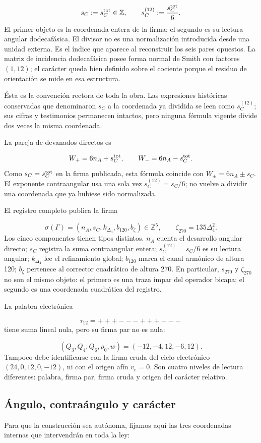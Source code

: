 \[
s_C:=s_C^{\rm tot}\in\mathbb Z,
\qquad
s_C^{(12)}:=\frac{s_C^{\rm tot}}6.
\]
El primer objeto es la coordenada entera de la firma; el segundo es su lectura angular dodecafásica. El divisor no es una normalización introducida desde una unidad externa. Es el índice que aparece al reconstruir los seis pares opuestos. La matriz de incidencia dodecafásica posee forma normal de Smith con factores \((1,12)\); el carácter queda bien definido sobre el cociente porque el residuo de orientación se mide en esa estructura.

Ésta es la convención rectora de toda la obra. Las expresiones históricas conservadas que denominaron \(s_C\) a la coordenada ya dividida se leen como \(s_C^{(12)}\); sus cifras y testimonios permanecen intactos, pero ninguna fórmula vigente divide dos veces la misma coordenada.

La pareja de devanados directos es

\[
W_+=6n_A+s_C^{\rm tot},
\qquad
W_-=6n_A-s_C^{\rm tot}.
\]
Como \(s_C=s_C^{\rm tot}\) en la firma publicada, esta fórmula coincide con \(W_\pm=6n_A\pm s_C\). El exponente contraangular usa una sola vez \(s_C^{(12)}=s_C/6\); no vuelve a dividir una coordenada que ya hubiese sido normalizada.

El registro completo publica la firma

\[
\sigma(\Gamma)=
(n_A,s_C,k_{\Delta_4},b_{120},b_\zeta)\in\mathbb Z^5,
\qquad
\zeta_{270}=135\Delta_4^2.
\]
Los cinco componentes tienen tipos distintos. \(n_A\) cuenta el desarrollo angular directo; \(s_C\) registra la suma contraangular entera; \(s_C^{(12)}=s_C/6\) es su lectura angular; \(k_{\Delta_4}\) lee el refinamiento global; \(b_{120}\) marca el canal armónico de altura 120; \(b_\zeta\) pertenece al corrector cuadrático de altura 270. En particular, \(s_{270}\) y \(\zeta_{270}\) no son el mismo objeto: el primero es una traza impar del operador bicapa; el segundo es una coordenada cuadrática del registro.

La palabra electrónica

\[
\tau_{12}=+++---+++---
\]
tiene suma lineal nula, pero su firma par no es nula:

\[
(Q_3,Q_4,Q_6,\rho_0,w)=(-12,-4,12,-6,12).
\]
Tampoco debe identificarse con la firma cruda del ciclo electrónico \((24,0,12,0,-12)\), ni con el origen afín \(v_e=0\). Son cuatro niveles de lectura diferentes: palabra, firma par, firma cruda y origen del carácter relativo.

\subsection{Ángulo, contraángulo y carácter}
Para que la construcción sea autónoma, fijamos aquí las tres coordenadas internas que intervendrán en toda la ley:

